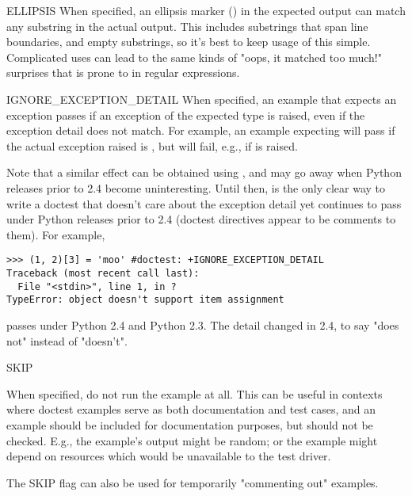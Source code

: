 \begin{datadesc}{ELLIPSIS}
    When specified, an ellipsis marker () in the expected output
    can match any substring in the actual output.  This includes
    substrings that span line boundaries, and empty substrings, so it's
    best to keep usage of this simple.  Complicated uses can lead to the
    same kinds of "oops, it matched too much!" surprises that 
    is prone to in regular expressions.
\end{datadesc}

\begin{datadesc}{IGNORE_EXCEPTION_DETAIL}
    When specified, an example that expects an exception passes if
    an exception of the expected type is raised, even if the exception
    detail does not match.  For example, an example expecting
     will pass if the actual exception raised is
    , but will fail, e.g., if
     is raised.

    Note that a similar effect can be obtained using ,
    and  may go away when Python releases
    prior to 2.4 become uninteresting.  Until then,
     is the only clear way to write a
    doctest that doesn't care about the exception detail yet continues
    to pass under Python releases prior to 2.4 (doctest directives
    appear to be comments to them).  For example,

\begin{verbatim}
>>> (1, 2)[3] = 'moo' #doctest: +IGNORE_EXCEPTION_DETAIL
Traceback (most recent call last):
  File "<stdin>", line 1, in ?
TypeError: object doesn't support item assignment
\end{verbatim}

    passes under Python 2.4 and Python 2.3.  The detail changed in 2.4,
    to say "does not" instead of "doesn't".

\end{datadesc}

\begin{datadesc}{SKIP}

    When specified, do not run the example at all.  This can be useful
    in contexts where doctest examples serve as both documentation and
    test cases, and an example should be included for documentation
    purposes, but should not be checked.  E.g., the example's output
    might be random; or the example might depend on resources which
    would be unavailable to the test driver.

    The SKIP flag can also be used for temporarily "commenting out"
    examples.

\end{datadesc}

